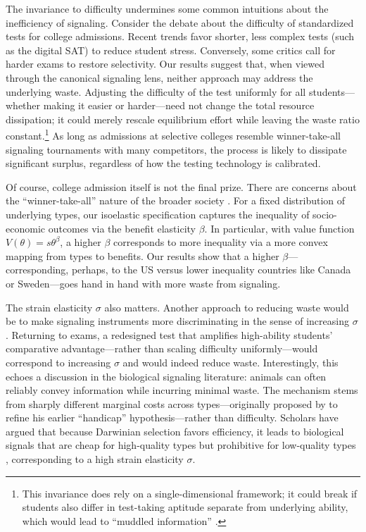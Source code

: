\documentclass[12 pt]{article}
\theoremstyle{remark}
\theoremstyle{definition}
\let\oldfootnote\footnote
\renewcommand\footnote[1]{\oldfootnote{\hspace{.5mm}#1}}
\begin{document}
The invariance to difficulty undermines some common intuitions about the inefficiency of signaling. Consider the debate about the difficulty of standardized tests for college admissions. Recent trends favor shorter, less complex tests (such as the digital SAT) to reduce student stress. 
Conversely, some critics %
call for harder exams to restore selectivity. Our results suggest that, when viewed through the canonical signaling lens, neither approach may address the underlying waste. Adjusting the difficulty of the test uniformly for all students---whether making it easier or harder---need not change the total resource dissipation; it could merely rescale equilibrium effort while leaving the waste ratio constant.\footnote{This invariance does rely on a single-dimensional framework; it could break if students also differ in test-taking aptitude separate from underlying ability, which would lead to ``muddled information'' \citep{FK19}.} As long as admissions at selective colleges resemble winner-take-all signaling tournaments with many competitors, the process is likely to dissipate significant surplus, regardless of how the testing technology is calibrated.

Of course, college admission itself is not the final prize. There are concerns about the ``winner-take-all'' nature of the broader society \citep[e.g.,][]{frank1996winner}. For a fixed distribution of underlying types, our isoelastic specification captures the inequality of socio-economic outcomes via the benefit elasticity $\beta$. In particular, with value function $V(\theta) = s \theta^\beta$, a higher $\beta$ corresponds to more inequality via a more convex mapping from types to benefits. Our results show that a higher $\beta$---corresponding, perhaps, to the US versus lower inequality countries like Canada or Sweden---goes hand in hand with more waste from signaling.

The strain elasticity $\sigma$ also matters. Another approach to reducing waste would be to make signaling instruments more discriminating in the sense of increasing $\sigma$. Returning to exams, a redesigned test that amplifies high-ability students' comparative advantage---rather than scaling difficulty uniformly---would correspond to increasing $\sigma$ and would indeed reduce waste. Interestingly, this echoes a discussion in the biological signaling literature: animals can often reliably convey information while incurring minimal waste. The mechanism stems from sharply different marginal costs across types---originally proposed by \citet{Zahavi77} to refine his earlier ``handicap'' hypothesis---rather than difficulty. Scholars have argued that because Darwinian selection favors efficiency, it leads to biological signals that are cheap for high-quality types but prohibitive for low-quality types \citep{PennSzamado20}, corresponding to a high strain elasticity $\sigma$.
\end{document}

